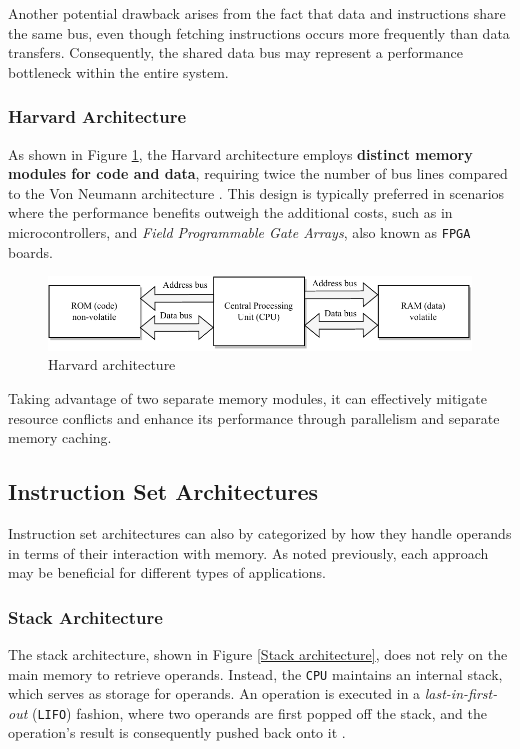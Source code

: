 \documentclass[english, ing, kiv, he, iso690numb, pdf]{fasthesis}
\begin{document}
	Another potential drawback arises from the fact that data and instructions share the same bus, even though fetching instructions occurs more frequently than data transfers. Consequently, the shared data bus may represent a performance bottleneck within the entire system.
	
	\subsubsection{Harvard Architecture}
	
	As shown in Figure \ref{Harvard architecture}, the Harvard architecture employs \textbf{distinct memory modules for code and data}, requiring twice the number of bus lines compared to the Von Neumann architecture \cite{harvard-architecture-1}. This design is typically preferred in scenarios where the performance benefits outweigh the additional costs, such as in microcontrollers, and \textit{Field Programmable Gate Arrays}, also known as \texttt{FPGA} boards.
	
	\begin{figure}[ht]
		\centering
		\includegraphics[width=.9\textwidth]{img/diagrams/harvard.pdf}
		\caption{Harvard architecture}
		\label{Harvard architecture}
	\end{figure}
	
	Taking advantage of two separate memory modules, it can effectively mitigate resource conflicts and enhance its performance through parallelism and separate memory caching.
	
	\subsection{Instruction Set Architectures}
	
	Instruction set architectures can also by categorized by how they handle operands in terms of their interaction with memory. As noted previously, each approach may be beneficial for different types of applications.
	
	\subsubsection{Stack Architecture}
	
	The stack architecture, shown in Figure \ref{Stack architecture}, does not rely on the main memory to retrieve operands. Instead, the \texttt{CPU} maintains an internal stack, which serves as storage for operands. An operation is executed in a \textit{last-in-first-out} (\texttt{LIFO}) fashion, where two operands are first popped off the stack, and the operation's result is consequently pushed back onto it \cite{computer-architecture-1}.
	
\end{document}
